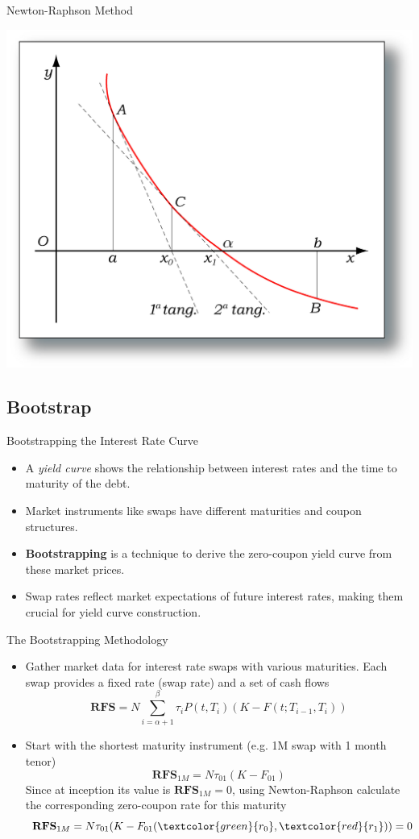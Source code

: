 \documentclass{beamer}
\begin{document}
\begin{frame}[fragile]{Newton-Raphson Method}
\begin{center}
    \includegraphics[width=0.6\linewidth]{images/newton_raphson}
\end{center}
\end{frame}

\subsection{Bootstrap}
\begin{frame}{Bootstrapping the Interest Rate Curve}
\begin{itemize}
\item A \emph{yield curve} shows the relationship between interest rates and the time to maturity of the debt.
\item Market instruments like swaps have different maturities and coupon structures.
\item \textbf{Bootstrapping} is a technique to derive the zero-coupon yield curve from these market prices.
\item Swap rates reflect market expectations of future interest rates, making them crucial for yield curve construction.
\end{itemize}
\end{frame}

\begin{frame}{The Bootstrapping Methodology}
\begin{itemize}
\item Gather market data for interest rate swaps with various maturities. Each swap provides a fixed rate (swap rate) and a set of cash flows
\begin{equation*}
\textbf{RFS} = N\sum_{i=\alpha+1}^{\beta}\tau_i P(t,T_i)(K-F(t;T_{i-1},T_i))
\end{equation*}
\item Start with the shortest maturity instrument (e.g. 1M swap with 1 month tenor)
\begin{equation*}
\textbf{RFS}_{1M} = N\tau_{01} (K-F_{01})
\end{equation*}
Since at inception its value is $\textbf{RFS}_{1M} = 0$, using Newton-Raphson calculate the corresponding zero-coupon rate for this maturity
\begin{equation*}
\textbf{RFS}_{1M} = N\tau_{01} (K-F_{01}(\textcolor{green}{r_0}, \textcolor{red}{r_1})) = 0
\end{equation*}
\end{itemize}
\end{frame}
\end{document}
